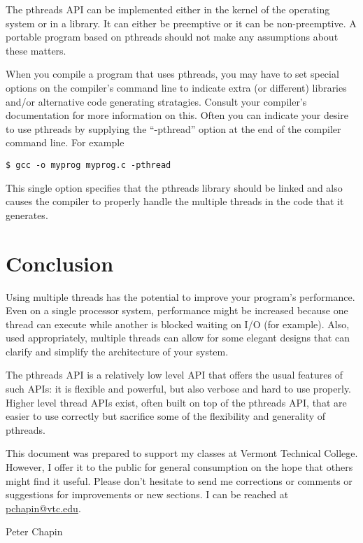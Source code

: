 \documentclass{article}
\begin{document}
The pthreads API can be implemented either in the kernel of the operating system or in a
library. It can either be preemptive or it can be non-preemptive. A portable program based on
pthreads should not make any assumptions about these matters.

When you compile a program that uses pthreads, you may have to set special options on the
compiler's command line to indicate extra (or different) libraries and/or alternative code
generating stratagies. Consult your compiler's documentation for more information on this. Often
you can indicate your desire to use pthreads by supplying the ``-pthread'' option at the end of
the compiler command line. For example

\begin{verbatim}
$ gcc -o myprog myprog.c -pthread
\end{verbatim}

This single option specifies that the pthreads library should be linked and also causes the
compiler to properly handle the multiple threads in the code that it generates.







\section{Conclusion}
\label{sec:conclusion}

Using multiple threads has the potential to improve your program's performance. Even on a single
processor system, performance might be increased because one thread can execute while another is
blocked waiting on I/O (for example). Also, used appropriately, multiple threads can allow for
some elegant designs that can clarify and simplify the architecture of your system.

The pthreads API is a relatively low level API that offers the usual features of such APIs: it
is flexible and powerful, but also verbose and hard to use properly. Higher level thread APIs
exist, often built on top of the pthreads API, that are easier to use correctly but sacrifice
some of the flexibility and generality of pthreads.

This document was prepared to support my classes at Vermont Technical College. However, I offer
it to the public for general consumption on the hope that others might find it useful. Please
don't hesitate to send me corrections or comments or suggestions for improvements or new
sections. I can be reached at \href{mailto:pchapin@vtc.edu}{pchapin@vtc.edu}.

Peter Chapin
\end{document}
